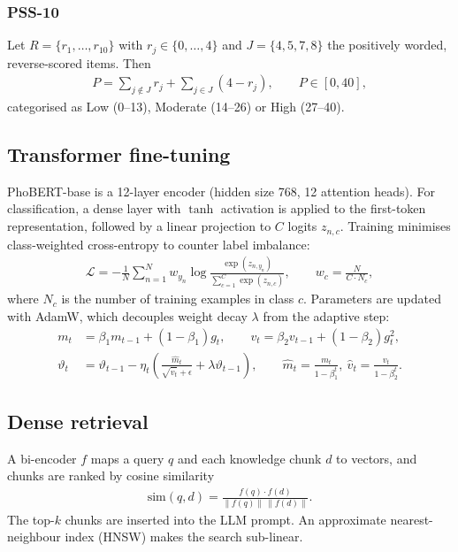 \subsubsection{PSS-10}
Let $R=\{r_1,\dots,r_{10}\}$ with $r_j\in\{0,\dots,4\}$ and $J=\{4,5,7,8\}$ the positively worded, reverse-scored items. Then
\begin{align}
	P = \sum_{j\notin J} r_j + \sum_{j\in J}(4-r_j), \qquad P\in[0,40], \label{eq:pss}
\end{align}
categorised as Low (0--13), Moderate (14--26) or High (27--40).

\subsection{Transformer fine-tuning}
PhoBERT-base is a 12-layer encoder (hidden size 768, 12 attention heads). For classification, a dense layer with $\tanh$ activation is applied to the first-token representation, followed by a linear projection to $C$ logits $z_{n,c}$. Training minimises class-weighted cross-entropy to counter label imbalance:
\begin{align}
	\mathcal{L} = -\frac{1}{N}\sum_{n=1}^{N} w_{y_n}\log\frac{\exp(z_{n,y_n})}{\sum_{c=1}^{C}\exp(z_{n,c})}, \qquad w_c=\frac{N}{C\cdot N_c}, \label{eq:loss}
\end{align}
where $N_c$ is the number of training examples in class $c$. Parameters are updated with AdamW, which decouples weight decay $\lambda$ from the adaptive step:
\begin{align}
	m_t &= \beta_1 m_{t-1} + (1-\beta_1)g_t, \qquad v_t = \beta_2 v_{t-1} + (1-\beta_2)g_t^2, \\
	\vartheta_t &= \vartheta_{t-1} - \eta_t\left(\frac{\hat m_t}{\sqrt{\hat v_t}+\epsilon} + \lambda\vartheta_{t-1}\right), \qquad \hat m_t=\frac{m_t}{1-\beta_1^t},\ \hat v_t=\frac{v_t}{1-\beta_2^t}.
\end{align}

\subsection{Dense retrieval}
A bi-encoder $f$ maps a query $q$ and each knowledge chunk $d$ to vectors, and chunks are ranked by cosine similarity
\begin{align}
	\mathrm{sim}(q,d) = \frac{f(q)\cdot f(d)}{\lVert f(q)\rVert\,\lVert f(d)\rVert}. \label{eq:cos}
\end{align}
The top-$k$ chunks are inserted into the LLM prompt. An approximate nearest-neighbour index (HNSW) makes the search sub-linear.

